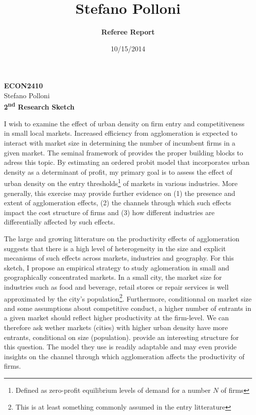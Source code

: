 \documentclass{article}
\title{\sc Stefano Polloni}
\author{\bf \Big Referee Report}
\date{10/15/2014}
\begin{document}
\large 

\vspace{5mm}
\begin{center}
{ \bf ECON2410} \\
{ \sc Stefano Polloni} \\
{ \bf 2\textsuperscript{nd} Research Sketch} \\
\end{center}

\vspace{4mm}

\begin{center}
\end{center}

\vspace{6mm}

\noindent I wish to examine the effect of urban density on firm entry and competitiveness in small local markets. Increased efficiency from agglomeration is expected to interact with market size in determining the number of incumbent firms in a given market. The seminal framework of \cite{bresnahan1991entry} provides the proper building blocks to adress this topic. By estimating an ordered probit model that incorporates urban density as a determinant of profit, my primary goal is to assess the effect of urban density on the entry thresholds\footnote{Defined as zero-profit equilibrium levels of demand for a number $N$ of firms} of markets in various industries. More generally, this exercise may provide further evidence on (1) the presence and extent of agglomeration effects, (2) the channels through which such effects impact the cost structure of firms and (3) how different industries are differentially affected by such effects. 

\vspace{2mm}

The large and growing litterature on the productivity effects of agglomeration suggests that there is a high level of heterogeneity in the size and explicit mecanisms of such effects across markets, industries and geography. For this sketch, 	I propose an empirical strategy to study aglomeration in small and geographically concentrated markets. In a small city, the market size for industries such as food and beverage, retail stores or repair services is well approximated by the city's population\footnote{This is at least something commonly assumed in the entry litterature}. Furthermore, conditionnal on market size and some assumptions about competitive conduct, a higher number of entrants in a given market should reflect higher productivity at the firm-level. We can therefore ask wether markets (cities) with higher urban density have more entrants, conditional on size (population). \cite{bresnahan1991entry} provide an interesting structure for this question. The model they use is readily adaptable and may even provide insights on the channel through which agglomeration affects the productivity of firms. \cite{jacob2003rotten}
\end{document}
